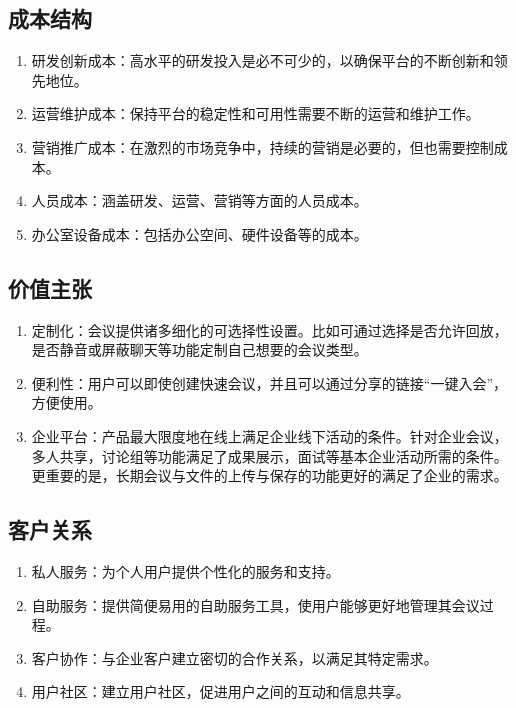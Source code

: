 \documentclass[a4paper,12pt]{article}
\begin{document}
    \subsection{成本结构}
    \begin{enumerate}
        \item 研发创新成本：高水平的研发投入是必不可少的，以确保平台的不断创新和领先地位。
        \item 运营维护成本：保持平台的稳定性和可用性需要不断的运营和维护工作。
        \item 营销推广成本：在激烈的市场竞争中，持续的营销是必要的，但也需要控制成本。
        \item 人员成本：涵盖研发、运营、营销等方面的人员成本。
        \item 办公室设备成本：包括办公空间、硬件设备等的成本。
    \end{enumerate}

    \subsection{价值主张}
    \begin{enumerate}
        \item 定制化：会议提供诸多细化的可选择性设置。比如可通过选择是否允许回放，是否静音或屏蔽聊天等功能定制自己想要的会议类型。
        \item 便利性：用户可以即使创建快速会议，并且可以通过分享的链接“一键入会”，方便使用。
        \item 企业平台：产品最大限度地在线上满足企业线下活动的条件。针对企业会议，多人共享，讨论组等功能满足了成果展示，面试等基本企业活动所需的条件。更重要的是，长期会议与文件的上传与保存的功能更好的满足了企业的需求。
    \end{enumerate}

    \subsection{客户关系}
    \begin{enumerate}
        \item 私人服务：为个人用户提供个性化的服务和支持。
        \item 自助服务：提供简便易用的自助服务工具，使用户能够更好地管理其会议过程。
        \item 客户协作：与企业客户建立密切的合作关系，以满足其特定需求。
        \item 用户社区：建立用户社区，促进用户之间的互动和信息共享。
    \end{enumerate}
\end{document}
